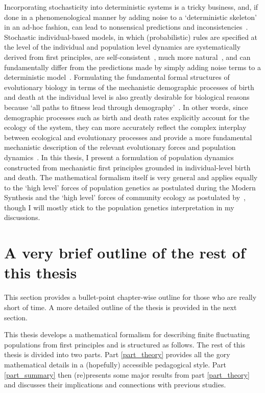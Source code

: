 Incorporating stochasticity into deterministic systems is a tricky business, and, if done in a phenomenological manner by adding noise to a `deterministic skeleton'~\citep{coulson_skeletons_2004} in an ad-hoc fashion, can lead to nonsensical predictions and inconsistencies~\citep{strang_how_2019}. Stochastic individual-based models, in which (probabilistic) rules are specified at the level of the individual and population level dynamics are systematically derived from first principles, are self-consistent~\citep{strang_how_2019}, much more natural~\citep{black_stochastic_2012}, and can fundamentally differ from the predictions made by simply adding noise terms to a deterministic model~\citep{strang_how_2019}. Formulating the fundamental formal structures of evolutionary biology in terms of the mechanistic demographic processes of birth and death at the individual level is also greatly desirable for biological reasons~\citep{metcalf_why_2007,geritz_mathematical_2012} because `all paths to fitness lead through demography'~\citep{metcalf_all_2007}. In other words, since demographic processes such as birth and death rates explicitly account for the ecology of the system, they can more accurately reflect the complex interplay between ecological and evolutionary processes and provide a more fundamental mechanistic description of the relevant evolutionary forces and population dynamics~\citep{doebeli_towards_2017}. In this thesis, I present a formulation of population dynamics constructed from mechanistic first principles grounded in individual-level birth and death. The mathematical formalism itself is very general and applies equally to the `high level' forces of population genetics as postulated during the Modern Synthesis and the `high level' forces of community ecology as postulated by~\cite{vellend_theory_2016}, though I will mostly stick to the population genetics interpretation in my discussions.

\section{A very brief outline of the rest of this thesis}
This section provides a bullet-point chapter-wise outline for those who are really short of time. A more detailed outline of the thesis is provided in the next section.

This thesis develops a mathematical formalism for describing finite fluctuating populations from first principles and is structured as follows. The rest of this thesis is divided into two parts. Part \ref{part_theory} provides all the gory mathematical details in a (hopefully) accessible pedagogical style. Part \ref{part_summary} then (re)presents some major results from part \ref{part_theory} and discusses their implications and connections with previous studies.

